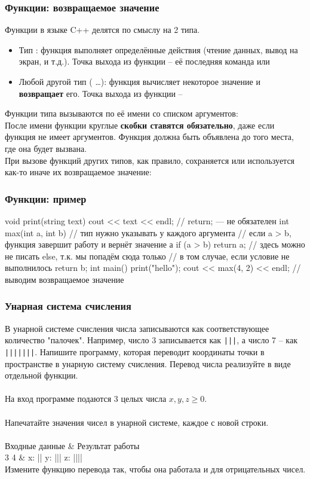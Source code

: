 \documentclass[PDF,10pt,usenames,dvipsnames,t,fragile]{beamer}
\newcommand{\inp}{\vspace{4pt}\\ \vspace{4pt}{\bf Входные данные} \\} %
\newcommand{\out}{\vspace{4pt}\\ \vspace{4pt}{\bf Результат работы} \\} %
\newcommand{\tb}{\\ \hline} %
\newenvironment{ex}{\vspace{4pt}\\ \vspace{4pt}{\bf Пример} \\
\tabularx{\textwidth}{|>{\tt}X|>{\tt}X|}
\hline \sf Входные данные & \sf Результат работы \tb}{\endtabularx}
\begin{document}
\begin{frame}
	\frametitle{Функции: возвращаемое значение}
	Функции в языке C++ делятся по смыслу на 2 типа.
	\begin{itemize}
		\item Тип : функция выполняет определённые действия (чтение
			данных, вывод на экран, и т.д.). Точка выхода из функции -- её последняя
			команда или 
		\item Любой другой тип ( \dots): функция вычисляет
			некоторое значение и {\bf возвращает} его. Точка выхода из функции --
	\end{itemize}
	Функции типа  вызываются по её имени со списком аргументов:
	\\
	После имени функции круглые {\bf скобки ставятся обязательно}, даже если
	функция не имеет аргументов. Функция должна быть объявлена до того места, где
	она будет вызвана. \\

	При вызове функций других типов, как правило, сохраняется или используется
	как-то иначе их возвращаемое значение: \\
\end{frame}

\begin{frame}[fragile]
	\frametitle{Функции: пример}
	\begin{code}
void print(string text)
{
	cout << text << endl;
	// return; — не обязателен
}
int max(int a, int b) // тип нужно указывать у каждого аргумента
{
	// если a > b, функция завершит работу и вернёт значение а
	if (a > b) return a;
	// здесь можно не писать else, т.к. мы попадём сюда только
	// в том случае, если условие не выполнилось
	return b;
}
int main()
{
	print("hello");
	cout << max(4, 2) << endl; // выводим возвращаемое значение
}
	\end{code}
\end{frame}

\begin{frame}
	\frametitle{Унарная система счисления}
В унарной системе счисления числа записываются как соответствующее
	количество "палочек". Например, число 3 записывается как {\tt |||}, а число 7 – как
	{\tt |||||||}. Напишите программу, которая переводит координаты точки в пространстве
	в унарную систему счисления. Перевод числа реализуйте в виде отдельной
	функции.
	\inp
	На вход программе подаются 3 целых числа $x, y, z \geq 0$. 
	\out
	Напечатайте значения чисел в унарной системе, каждое с новой строки.
	\begin{ex}
		2 3 4 & x: || \newline y: ||| \newline z: |||| \tb
	\end{ex}
	{\bf *}Измените функцию перевода так, чтобы она работала и для отрицательных
	чисел.
\end{frame}
\end{document}
